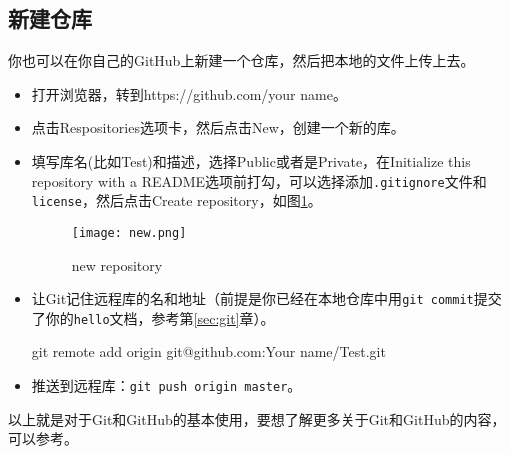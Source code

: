 \documentclass[a4paper,12pt]{article}
\begin{document}
\subsection{新建仓库}

你也可以在你自己的GitHub上新建一个仓库，然后把本地的文件上传上去。

\begin{itemize}
\item 打开浏览器，转到https://github.com/your name。
\item 点击Respositories选项卡，然后点击New，创建一个新的库。
\item 填写库名(比如Test)和描述，选择Public或者是Private，在Initialize this repository with a README选项前打勾，可以选择添加\verb|.gitignore|文件和\verb|license|，然后点击Create repository，如图\ref{fig:1}。
\begin{figure}[!htb] %
\centering
\texttt{[image: new.png]}
\caption{new repository}\label{fig:1}
\end{figure}
\item 让Git记住远程库的名和地址（前提是你已经在本地仓库中用\lstinline|git commit|提交了你的\verb|hello|文档，参考第\ref{sec:git}章）。
\begin{bash}
git remote add origin git@github.com:Your name/Test.git
\end{bash}
\item 推送到远程库：\lstinline|git push origin master|。
\end{itemize}

以上就是对于Git和GitHub的基本使用，要想了解更多关于Git和GitHub的内容，可以参考\cite{1:misc}\cite{3:misc}。


\end{document}
